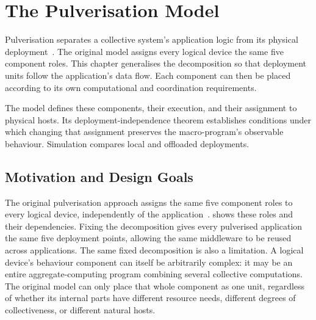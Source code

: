 \chapter{The Pulverisation Model}
\label{chap:pulverization}

Pulverisation separates a collective system's application logic from its physical deployment~\cite{DBLP:journals/fi/CasadeiPPVW20}.
The original model assigns every logical device the same five component roles.
This chapter generalises the decomposition so that deployment units follow the application's data flow.
Each component can then be placed according to its own computational and coordination requirements.

The model defines these components, their execution, and their assignment to physical hosts.
Its deployment-independence theorem establishes conditions under which changing that assignment preserves the macro-program's observable behaviour.
Simulation compares local and offloaded deployments.

\section{Motivation and Design Goals}
\label{sec:pulverization-motivation}

The original pulverisation approach assigns the same five component roles to every logical device, independently of the application~\cite{DBLP:journals/fi/CasadeiPPVW20}.
 shows these roles and their dependencies.
%
Fixing the decomposition gives every pulverised application the same five deployment points,
allowing the same middleware to be reused across applications.
%
The same fixed decomposition is also a limitation.
%
A logical device's behaviour component can itself be arbitrarily complex:
it may be an entire aggregate-computing program combining several collective computations.
%
The original model can only place that whole component as one unit,
regardless of whether its internal parts have different resource needs,
different degrees of collectiveness,
or different natural hosts.

